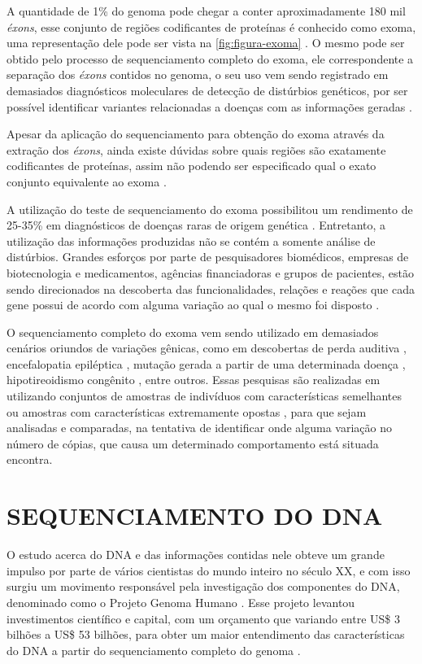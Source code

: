 A quantidade de 1\% do genoma pode chegar a conter aproximadamente 180 mil \textit{éxons}, esse conjunto de regiões codificantes de proteínas é conhecido como exoma, uma representação dele pode ser vista na \autoref{fig:figura-exoma} \cite{Bamshad2011}. O mesmo pode ser obtido pelo processo de sequenciamento completo do exoma, ele correspondente a separação dos \textit{éxons} contidos no genoma, o seu uso vem sendo registrado em demasiados diagnósticos moleculares de detecção de distúrbios genéticos, por ser possível identificar variantes relacionadas a doenças com as informações geradas \cite{Bamshad2011,Lee2014,HutchisonIII2007}. 

Apesar da aplicação do sequenciamento para obtenção do exoma através da extração dos \textit{éxons}, ainda existe dúvidas sobre quais regiões são exatamente codificantes de proteínas, assim não podendo ser especificado qual o exato conjunto equivalente ao exoma \cite{Bamshad2011}.

A utilização do teste de sequenciamento do exoma possibilitou um rendimento de 25-35\% em diagnósticos de doenças raras de origem genética \cite{Bamshad2011}. Entretanto, a utilização das informações produzidas não se contém a somente análise de distúrbios. Grandes esforços por parte de pesquisadores biomédicos, empresas de biotecnologia e medicamentos, agências financiadoras e grupos de pacientes, estão sendo direcionados na descoberta das funcionalidades, relações e reações que cada gene possui de acordo com alguma variação ao qual o mesmo foi disposto \cite{Antonarakis2006}. 

O sequenciamento completo do exoma vem sendo utilizado em demasiados cenários oriundos de variações gênicas, como em descobertas de perda auditiva \cite{Likar2018}, encefalopatia epiléptica \cite{Allen2016}, mutação gerada a partir de uma determinada doença \cite{Lin2019}, hipotireoidismo congênito \cite{Fu2019}, entre outros. Essas pesquisas são realizadas em utilizando conjuntos de amostras de indivíduos com características semelhantes ou amostras com características extremamente opostas \cite{Bamshad2011}, para que sejam analisadas e comparadas, na tentativa de identificar onde alguma variação no número de cópias, que causa um determinado comportamento está situada encontra.

\section{SEQUENCIAMENTO DO DNA} 
O estudo acerca do DNA e das informações contidas nele obteve um grande impulso por parte de vários cientistas do mundo inteiro no século XX, e com isso surgiu um movimento responsável pela investigação dos componentes do DNA, denominado como o Projeto Genoma Humano \cite{Lander2001}. Esse projeto levantou investimentos científico e capital, com um orçamento que variando entre US\$ 3 bilhões a US\$ 53 bilhões, para obter um maior entendimento das características do DNA a partir do sequenciamento completo do genoma \cite{Marian2011}. 

